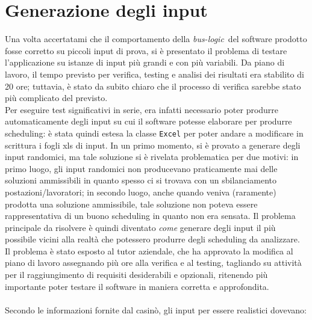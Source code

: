 \section{Generazione degli input}
Una volta accertatami che il comportamento della \emph{\gls{bus-logic}}\glsfirstoccur\ del software prodotto fosse corretto su piccoli input di prova, si è presentato il problema di testare l'applicazione su istanze di input più grandi e con più variabili. Da piano di lavoro, il tempo previsto per verifica, testing e analisi dei risultati era stabilito di 20 ore; tuttavia, è stato da subito chiaro che il processo di verifica sarebbe stato più complicato del previsto.\\
Per eseguire test significativi in serie, era infatti necessario poter produrre automaticamente degli input su cui il software potesse elaborare per produrre scheduling: è stata quindi estesa la classe \texttt{Excel} per poter andare a modificare in scrittura i fogli xls di input. In un primo momento, si è provato a generare degli input randomici, ma tale soluzione si è rivelata problematica per due motivi: in primo luogo, gli input randomici non producevano praticamente mai delle soluzioni ammissibili in quanto spesso ci si trovava con un sbilanciamento postazioni/lavoratori; in secondo luogo, anche quando veniva (raramente) prodotta una soluzione ammissibile, tale soluzione non poteva essere rappresentativa di un buono scheduling in quanto non era sensata. Il problema principale da risolvere è quindi diventato \textit{come} generare degli input il più possibile vicini alla realtà che potessero produrre degli scheduling da analizzare.\\
Il problema è stato esposto al tutor aziendale, che ha approvato la modifica al piano di lavoro assegnando più ore alla verifica e al testing, tagliando su attività per il raggiungimento di requisiti desiderabili e opzionali, ritenendo più importante poter testare il software in maniera corretta e approfondita. \\
\\
Secondo le informazioni fornite dal casinò, gli input per essere realistici dovevano:
